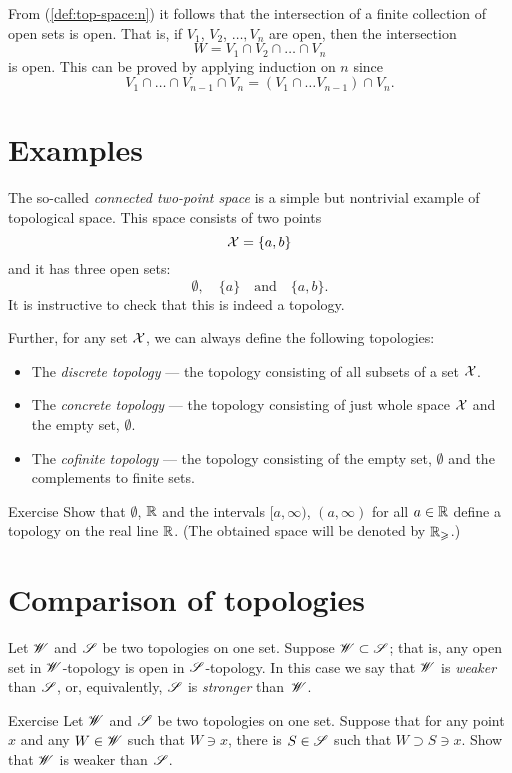 From (\ref{def:top-space:n}) it follows that the intersection of a finite collection of open sets is open.
That is, if $V_1$, $V_2$, $\dots, V_n$ are open, then the intersection 
\[W=V_1 \cap V_2\cap\dots\cap V_n\] is open.
This can be proved by applying induction on $n$ since 
\[V_1 \cap \dots\cap V_{n-1}\cap V_n=(V_1 \cap \dots V_{n-1})\cap V_n.\]

\section{Examples}

The so-called \emph{connected two-point space} is a simple but nontrivial example of topological space.
This space consists of two points 
\[\mathcal{X}=\{a,b\}\]
and it has three open sets: 
\[\emptyset,\quad \{a\}\quad\text{and}\quad\{a,b\}.\]
It is instructive to check that this is indeed a topology.

Further, for any set $\mathcal{X}$, we can always define the following topologies:
\begin{itemize} 
\item  The \emph{discrete topology} --- the topology consisting of all subsets of a set $\mathcal{X}$.
\item  The \emph{concrete topology}  --- the topology consisting of just whole space $\mathcal{X}$ and the empty set, $\emptyset$.
\item  The \emph{cofinite topology} --- the topology consisting of the empty set, $\emptyset$ and the complements to finite sets.
\end{itemize}

\begin{thm}{Exercise}\label{ex:Rge}
Show that $\emptyset$, $\mathbb{R}$ and the intervals $[a,\infty)$, $(a,\infty)$ for all $a\in\mathbb{R}$ define a topology on the real line $\mathbb{R}$.
(The obtained space will be denoted by $\mathbb{R}_\geqslant$.)
\end{thm}

\section{Comparison of topologies}

Let $\mathscr{W}$ and $\mathscr{S}$ be two topologies on one set.
Suppose $\mathscr{W}\subset\mathscr{S}$; that is, any open set in $\mathscr{W}$-topology is open in $\mathscr{S}$-topology.
In this case we say that $\mathscr{W}$ is \emph{weaker} than $\mathscr{S}$, or, equivalently, $\mathscr{S}$ is \emph{stronger} than~$\mathscr{W}$.

\begin{thm}{Exercise}
Let $\mathscr{W}$ and $\mathscr{S}$ be two topologies on one set.
Suppose that for any point $x$ and any $W\in\mathscr{W}$ such that $W\ni x$, there is $S\in \mathscr{S}$ such that 
$W\supset S\ni x$.
Show that $\mathscr{W}$ is weaker than $\mathscr{S}$.
\end{thm}



